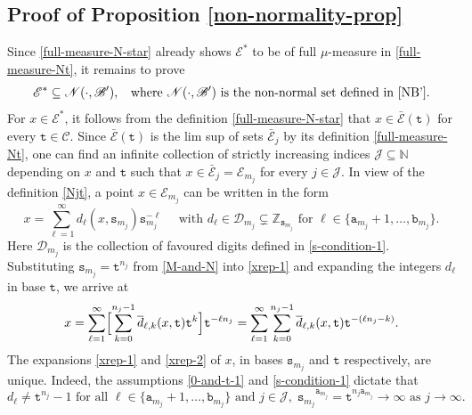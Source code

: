 \documentclass[12pt, twoside]{article}
\theoremstyle{definition}
\numberwithin{equation}{section}
\begin{document}
\subsection{Proof of Proposition \ref{non-normality-prop}} 
Since \eqref{full-measure-N-star} already shows $\mathscr{E}^{\ast}$ to be of full $\mu$-measure in \eqref{full-measure-Nt}, it remains to prove
\begin{equation} \label{N-non-normal} 
\mathscr{E}^{\ast} \subseteq \mathscr N(\cdot, \mathscr{B}'), \; \; \text{ where $\mathscr N(\cdot, \mathscr{B}')$ is the non-normal set defined in \eqref{NB'}}. 
\end{equation} 
For $x \in \mathscr{E}^{\ast}$, it follows from the definition \eqref{full-measure-N-star} that $x \in \bar{\mathscr{E}}(\mathtt t)$ for every $\mathtt t \in \mathscr{C}$. Since $\bar{\mathscr{E}}(\mathtt t)$ is the lim sup of sets $\bar{\mathscr{E}}_j$ by its definition \eqref{full-measure-Nt}, one can find an  infinite collection of strictly increasing indices $\mathscr{J} \subseteq \mathbb N$ depending on $x$ and $\mathtt t$ such that $x \in \bar{\mathscr E}_j = \mathscr{E}_{m_j}$ for every $j \in \mathscr{J}$. In view of the definition \eqref{Njt},  a point $x \in \mathscr{E}_{m_j}$ can be written in the form 
\begin{equation} x = \sum_{\ell=1}^{\infty} d_{\ell}(x, \mathtt s_{m_j}) \mathtt s_{m_j}^{-\ell} \quad \text{ with } d_{\ell} \in \mathscr{D}_{m_j} \subsetneq \mathbb Z_{\mathtt s_{m_j}}\text{ for } \ell \in \bigl\{\mathtt a_{m_j}+1, \ldots, \mathtt b_{m_j} \bigr\}. \label{xrep-1} 
\end{equation} 
Here $\mathscr{D}_{m_j}$ is the collection of favoured digits defined in \eqref{s-condition-1}. Substituting  $\mathtt s_{m_j} = \mathtt t^{n_j}$ from \eqref{M-and-N} into \eqref{xrep-1} and expanding the integers $d_{\ell}$ in base $\mathtt t$, we arrive at 
\begin{equation}   
x =\sum_{\ell=1}^{\infty} \Bigl[ \sum_{k=0}^{n_j-1} \overline{d}_{\ell, k}(x, \mathtt t) \mathtt t^{k} \Bigr] \mathtt t^{-\ell n_j} = \sum_{\ell=1}^{\infty} \sum_{k=0}^{n_j-1} \overline{d}_{\ell, k}(x, \mathtt t) \mathtt t^{-(\ell n_j-k)}. \label{xrep-2}
\end{equation}  
The expansions \eqref{xrep-1} and \eqref{xrep-2} of $x$, in bases $\mathtt s_{m_j}$ and $\mathtt t$ respectively, are unique. Indeed, the assumptions \eqref{0-and-t-1} and \eqref{s-condition-1} dictate that 
\begin{equation}  \label{uniqueness-argument}
d_{\ell} \neq \mathtt t^{n_j}-1 \text{ for all } \ell \in \{\mathtt a_{m_j}+1, \ldots, \mathtt b_{m_j}\} \text{ and } j \in \mathscr{J}, \; {\mathtt s_{m_j}}^{\mathtt a_{m_j}} = {\mathtt t}^{n_j \mathtt a_{m_j}}\to \infty \text{ as } j \to \infty. 
\end{equation}  
\end{document}
